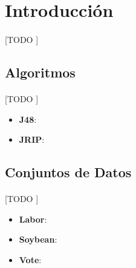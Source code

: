 \documentclass{article}
\begin{document}
	\maketitle %

	\thispagestyle{fancy} %



	\begin{abstract}
		\noindent [TODO ]
	\end{abstract}



	\section{Introducción}
	\label{sec:introducción}

		\paragraph{}
		[TODO ]

		\subsection{Algoritmos}

			\paragraph{}
			[TODO ]

			\begin{itemize}
				\item \textbf{J48}:
				\item \textbf{JRIP}:
			\end{itemize}

		\subsection{Conjuntos de Datos}

			\paragraph{}
			[TODO ]

			\begin{itemize}
				\item \textbf{Labor}\cite{dataset:labor}:
				\item \textbf{Soybean}\cite{dataset:soybean}:
				\item \textbf{Vote}\cite{dataset:vote}:
			\end{itemize}
\end{document}
